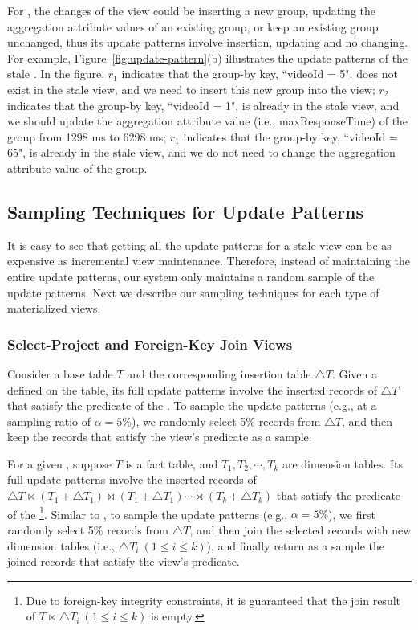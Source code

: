For \aggview, the changes of the view could be inserting a new group, updating the aggregation attribute values of an existing group, or keep an existing group unchanged, thus its update patterns involve insertion, updating and no changing. 
For example, Figure~\ref{fig:update-pattern}(b) illustrates the update patterns of the stale \aggview. In the figure, $r_1$ indicates that the group-by key, ``videoId = 5", does not exist in the stale view, and we need to insert this new group into the view; $r_2$ indicates that the group-by key, ``videoId = 1", is already in the stale view, and we should update the aggregation attribute value (i.e., \textsf{maxResponseTime}) of the group from 1298 ms to 6298 ms; $r_1$ indicates that the group-by key, ``videoId = 65", is already in the stale view, and we do not need to change the aggregation attribute value of the group.    



\subsection{Sampling Techniques for Update Patterns}\label{subsec:sample-pattern}
It is easy to see that getting all the update patterns for a stale view can be as expensive as incremental view maintenance. Therefore, instead of maintaining the entire update patterns, our system only maintains a random sample of the update patterns. Next we describe our sampling techniques for each type of materialized views.

\subsubsection{Select-Project and Foreign-Key Join Views}
Consider a base table $T$ and the corresponding insertion table $\triangle T$. Given a \spview defined on the table, its full update patterns involve the inserted records of $\triangle T$ that satisfy the predicate of the \spview. To sample the update patterns (e.g., at a sampling ratio of $\alpha = 5 \%$), we randomly select 5\% records from $\triangle T$, and then keep the records that satisfy the view's predicate as a sample. 

\sloppy

For a given \fjview, suppose $T$ is a fact table, and $T_1, T_2, \cdots, T_k$ are dimension tables. Its full update patterns involve the inserted records of $\triangle T \bowtie (T_1+\triangle T_1) \bowtie (T_1+\triangle T_1) \cdots \bowtie (T_k+\triangle T_k)$ that satisfy the predicate of the \fjview\footnote{Due to foreign-key integrity constraints, it is guaranteed that the join result of $T \bowtie \triangle T_i ~(1\leq i \leq k)$ is empty.}. Similar to \spview, to sample the update patterns (e.g., $\alpha= 5 \%$), we first randomly select 5\% records from $\triangle T$, and then join the selected records with new dimension tables (i.e., $\triangle T_i ~(1\leq i \leq k)$), and finally return as a sample the joined records that satisfy the view's predicate. 

